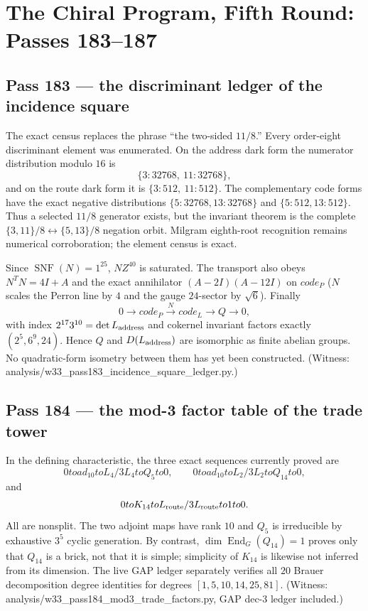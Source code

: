 \documentclass[12pt,a4paper]{article}
\def\mathbb#1{#1}%
\def\mathrm#1{#1}%
\def\mathbf#1{#1}%
\def\texttt#1{#1}%
\def\to{ to }%
\theoremstyle{definition}
\begin{document}
\section{The Chiral Program, Fifth Round: Passes 183--187}
\label{sec:chiral-program-five}

\subsection{Pass 183 --- the discriminant ledger of the incidence square}
\label{ssec:pass183}

The exact census replaces the phrase ``the two-sided $11/8$.''  Every
order-eight discriminant element was enumerated.  On the address dark
form the numerator distribution modulo $16$ is
\[
  \{3:32768,\ 11:32768\},
\]
and on the route dark form it is $\{3:512,\ 11:512\}$.  The complementary
code forms have the exact negative distributions
$\{5:32768,13:32768\}$ and $\{5:512,13:512\}$.  Thus a selected
$11/8$ generator exists, but the invariant theorem is the complete
$\{3,11\}/8\leftrightarrow\{5,13\}/8$ negation orbit.  Milgram
eighth-root recognition remains numerical corroboration; the element
census is exact.

Since $\operatorname{SNF}(N)=1^{25}$, $N\mathbb Z^{40}$ is saturated.
The transport also obeys $N^TN=4I+A$ and the exact annihilator
$(A-2I)(A-12I)$ on $\mathrm{code}_P$ ($N$ scales the Perron line by $4$
and the gauge $24$-sector by $\sqrt6$).  Finally
\[
  0\longrightarrow \mathrm{code}_P
  \xrightarrow{\;N\;}\mathrm{code}_L
  \longrightarrow Q\longrightarrow 0,
\]
with index $2^{17}3^{10}=\det L_{\rm address}$ and cokernel invariant
factors exactly $(2^5,6^9,24)$.  Hence $Q$ and
$D(L_{\rm address})$ are isomorphic as finite abelian groups.  No
quadratic-form isometry between them has yet been constructed.
(Witness: \texttt{analysis/w33\_pass183\_incidence\_square\_ledger.py}.)

\subsection{Pass 184 --- the mod-3 factor table of the trade tower}
\label{ssec:pass184}

In the defining characteristic, the three exact sequences currently
proved are
\[
  0\to\mathrm{ad}_{10}\to L_4/3L_4\to Q_5\to0,
  \qquad
  0\to\mathrm{ad}_{10}\to L_2/3L_2\to Q_{14}\to0,
\]
and
\[
  0\to K_{14}\to L_{\rm route}/3L_{\rm route}\to\mathbf1\to0.
\]
All are nonsplit.  The two adjoint maps have rank $10$ and $Q_5$ is
irreducible by exhaustive $3^5$ cyclic generation.  By contrast,
$\dim\operatorname{End}_G(Q_{14})=1$ proves only that $Q_{14}$ is a
brick, not that it is simple; simplicity of $K_{14}$ is likewise not
inferred from its dimension.  The live GAP ledger separately verifies
all $20$ Brauer decomposition degree identities for degrees
$[1,5,10,14,25,81]$. (Witness:
\texttt{analysis/w33\_pass184\_mod3\_trade\_factors.py}, GAP dec-3
ledger included.)
\end{document}
